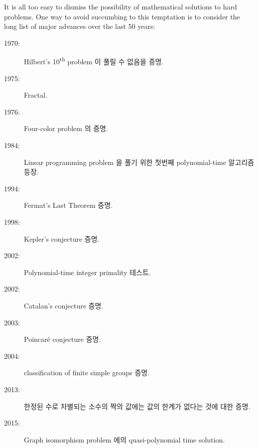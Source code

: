It is all too easy to dismiss the possibility of mathematical solutions
to hard problems.
One way to avoid succumbing to this temptation is to consider the
long list of major advances over the last 50 years:
\fi

\begin{description}
\item[1970:] Hilbert's 10\textsuperscript{th} problem 이 풀릴 수 없음을 증명.
\item[1975:] Fractal.
\item[1976:] Four-color problem 의 증명.
\item[1984:] Linear programming problem 을 풀기 위한 첫번째 polynomial-time
	     알고리즘 등장.
\item[1994:] Fermat's Last Theorem 증명.
\item[1998:] Kepler's conjecture 증명.
\item[2002:] Polynomial-time integer primality 테스트.
\item[2002:] Catalan's conjecture 증명.
\item[2003:] Poincar\'e conjecture 증명.
\item[2004:] classification of finite simple groups 증명.
\item[2013:] 한정된 수로 차별되는 소수의 짝의 값에는 값의 한계가 없다는 것에
	     대한 증명.
\item[2015:] Graph isomorphism problem 에의 quasi-polynomial time solution.

\end{description}

